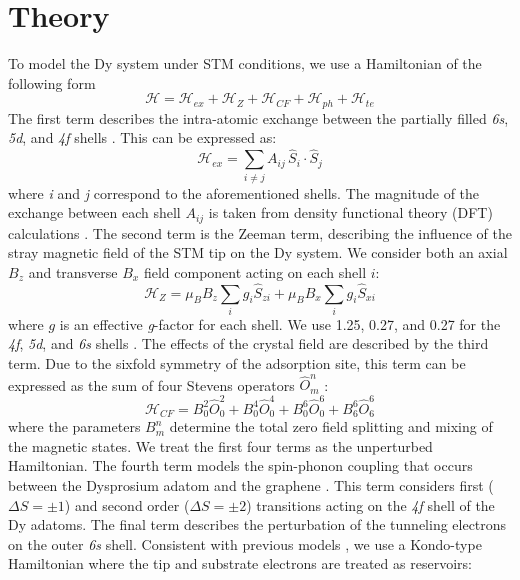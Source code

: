 \documentclass[
reprint,amsmath,amssymb,aps]{revtex4-2}
\begin{document}
\section{Theory}
To model the Dy system under STM conditions, we use a Hamiltonian of the following form
\begin{equation}
\mathcal{H} = \mathcal{H}_{ex} + \mathcal{H}_{Z} + \mathcal{H}_{CF}  + \mathcal{H}_{ph} + \mathcal{H}_{te}
\end{equation}
The first term describes the intra-atomic exchange between the partially filled \textit{6s}, \textit{5d}, and \textit{4f} shells \citep{pivetta2020}. This can be expressed as:
\begin{equation}
\mathcal{H}_{ex} =\sum_{i\neq j} A_{ij} \, \hat{S}_{i} \cdot \hat{S}_{j}
\end{equation}
where \textit{i} and \textit{j} correspond to the aforementioned shells. The magnitude of the exchange between each shell $A_{ij}$ is taken from density functional theory (DFT) calculations \citep{Delin1997,pivetta2020}. The second term is the Zeeman term, describing the influence of the stray magnetic field of the STM tip on the Dy system. We consider both an axial $B_z$ and transverse  $B_x$ field component acting on each shell $i$:
\begin{equation}
\mathcal{H}_{Z} = \mu_{B} B_z  \sum_{i} g_{i} \hat{S}_{zi} + \mu_{B} B_x  \sum_{i} g_{i} \hat{S}_{xi}
\end{equation}
where $g$ is an effective \textit{g}-factor for each shell. We use 1.25, 0.27, and 0.27 for the \textit{4f}, \textit{5d}, and \textit{6s} shells \citep{pivetta2020}. The effects of the crystal field are described by the third term. Due to the sixfold symmetry of the adsorption site, this term can be expressed as the sum of four Stevens operators $\hat{O}^{n}_{m}$ \citep{baltic2016, Stevens_1952}:
\begin{equation}
\mathcal{H}_{CF} = B^{2}_{0} \hat{O}^{2}_{0} + B^{4}_{0} \hat{O}^{4}_{0} + B^{6}_{0} \hat{O}^{6}_{0} + B^{6}_{6} \hat{O}^{6}_{6}
\end{equation}
where the parameters $B^{n}_{m}$ determine the total zero field splitting and mixing of the magnetic states. We treat the first four terms as the unperturbed Hamiltonian. The fourth term models the spin-phonon coupling that occurs between the Dysprosium adatom and the graphene \citep{cervetti2016,fort1998}. This term considers first ($\Delta S = \pm 1$) and second order ($\Delta S = \pm 2$) transitions acting on the \textit{4f} shell of the Dy adatoms. The final term describes the perturbation of the tunneling electrons on the outer \textit{6s} shell. Consistent with previous models \citep{anderson1966,schrieffer1966,appelbaum1967,delgado2010,loth2010,Ternes2015}, we use a Kondo-type Hamiltonian where the tip and substrate electrons are treated as reservoirs:  
\end{document}
